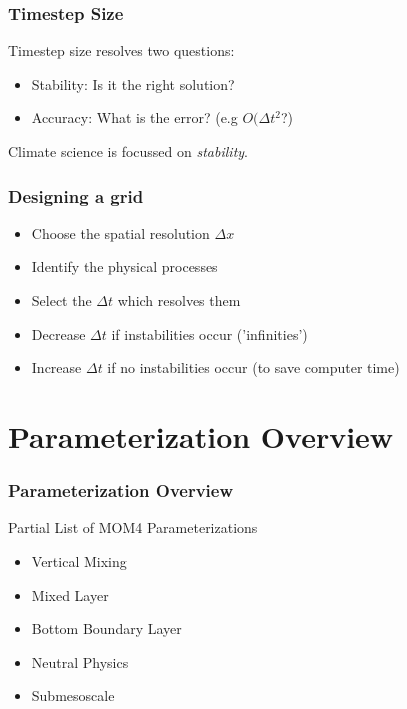 \documentclass[red]{beamer}
\begin{document}
\begin{frame}
    \frametitle{Timestep Size}
    
    Timestep size resolves two questions:
    \begin{itemize}
        \item Stability: Is it the right solution?
        \item Accuracy: What is the error? (e.g $O(\Delta t^2$?)
    \end{itemize}
    Climate science is focussed on \textit{stability}.
    
\end{frame}

\begin{frame}
    \frametitle{Designing a grid}

    \begin{itemize}
        \item Choose the spatial resolution $\Delta x$
        \item Identify the physical processes
        \item Select the $\Delta t$ which resolves them
        \item Decrease $\Delta t$ if instabilities occur ('infinities')
        \item Increase $\Delta t$ if no instabilities occur (to save computer
            time)
    \end{itemize}

\end{frame}
\section{Parameterization Overview}
\begin{frame}
    \frametitle{Parameterization Overview}
    
    Partial List of MOM4 Parameterizations
    \begin{itemize}
        \item Vertical Mixing
        \item Mixed Layer
        \item Bottom Boundary Layer
        \item Neutral Physics
        \item Submesoscale
    \end{itemize}
\end{frame}
\end{document}
